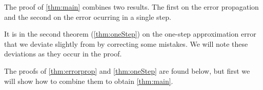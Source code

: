 The proof of \cref{thm:main} combines two results.
The first on the error propagation and the second on the error
ocurring in a single step.

It is in the second theorem (\ref{thm:oneStep})
on the one-step approximation error
that we deviate slightly from  by correcting some mistakes.
We will note these deviations as they occur in the proof.

The proofs of \cref{thm:errorprop} and \cref{thm:oneStep} are
found below, but first 
we will show how to combine them to obtain
\cref{thm:main}.




